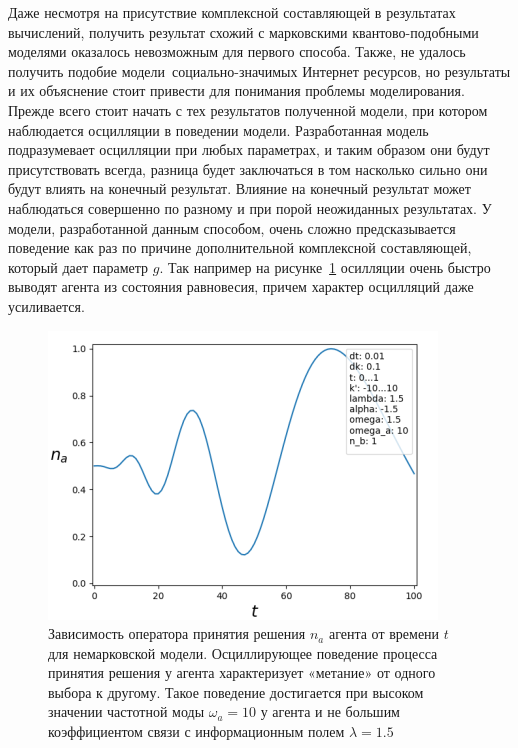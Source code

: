 Даже несмотря на присутствие комплексной составляющей в результатах вычислений, получить результат
схожий с марковскими квантово-подобными моделями оказалось невозможным для первого способа.
Также, не удалось получить подобие модели~социально-значимых Интернет ресурсов, но результаты и их
объяснение стоит привести для понимания проблемы моделирования.
Прежде всего стоит начать с тех результатов полученной модели, при котором наблюдается осцилляции в
поведении модели.
Разработанная модель подразумевает осцилляции при любых параметрах, и таким образом они будут присутствовать
всегда, разница будет заключаться в том насколько сильно они будут влиять на конечный результат.
Влияние на конечный результат может наблюдаться совершенно по разному и при порой неожиданных результатах.
У модели, разработанной данным способом, очень сложно предсказывается поведение как раз по причине
дополнительной комплексной составляющей, который дает параметр $g$.
Так например на рисунке~\ref{fig:fr_oscillation} осилляции очень быстро выводят агента из состояния
равновесия, причем характер осцилляций даже усиливается.
\begin{figure}[h!]
    \centering
    \captionsetup{justification=centering}
    \includegraphics[width=0.65\linewidth]{pictures/result_first_1.png}
    \caption{Зависимость оператора принятия решения $n_{a}$ агента от времени $t$ для немарковской модели.
    Осциллирующее поведение процесса принятия решения у агента характеризует «метание» от одного выбора к другому.
    Такое поведение достигается при высоком значении частотной моды $\omega_{a} = 10$ у агента и не большим
    коэффициентом связи с информационным полем $\lambda = 1.5$}
    \label{fig:fr_oscillation}
\end{figure}

